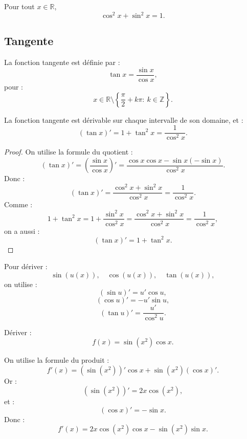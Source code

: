 \documentclass[11pt,a4paper]{article}
\newcommand{\Z}{\mathbb Z}
\newcommand{\R}{\mathbb R}
\begin{document}
\begin{theorembox}
Pour tout \(x\in\R\),
\[
\cos^2 x+\sin^2 x=1.
\]
\end{theorembox}

\subsection{Tangente}

\begin{definitionbox}[Tangente]
La fonction tangente est définie par :
\[
\tan x=\frac{\sin x}{\cos x},
\]
pour :
\[
x\in\R\setminus\left\{\frac{\pi}{2}+k\pi:\ k\in\Z\right\}.
\]
\end{definitionbox}

\begin{theorembox}
La fonction tangente est dérivable sur chaque intervalle de son domaine, et :
\[
(\tan x)'=1+\tan^2 x=\frac1{\cos^2 x}.
\]
\end{theorembox}

\begin{proof}
On utilise la formule du quotient :
\[
(\tan x)'=
\left(\frac{\sin x}{\cos x}\right)'
=
\frac{\cos x\cos x-\sin x(-\sin x)}{\cos^2 x}.
\]
Donc :
\[
(\tan x)'=\frac{\cos^2 x+\sin^2 x}{\cos^2 x}
=
\frac1{\cos^2 x}.
\]
Comme :
\[
1+\tan^2 x
=
1+\frac{\sin^2 x}{\cos^2 x}
=
\frac{\cos^2 x+\sin^2 x}{\cos^2 x}
=
\frac1{\cos^2 x},
\]
on a aussi :
\[
(\tan x)'=1+\tan^2 x.
\]
\end{proof}

\begin{methodbox}
Pour dériver :
\[
\sin(u(x)),\quad \cos(u(x)),\quad \tan(u(x)),
\]
on utilise :
\[
(\sin u)'=u'\cos u,
\]
\[
(\cos u)'=-u'\sin u,
\]
\[
(\tan u)'=\frac{u'}{\cos^2 u}.
\]
\end{methodbox}

\begin{exercicebox}[Trigonométrie]
Dériver :
\[
f(x)=\sin(x^2)\cos x.
\]
\end{exercicebox}

\begin{correctionbox}
On utilise la formule du produit :
\[
f'(x)=(\sin(x^2))'\cos x+\sin(x^2)(\cos x)'.
\]
Or :
\[
(\sin(x^2))'=2x\cos(x^2),
\]
et :
\[
(\cos x)'=-\sin x.
\]
Donc :
\[
f'(x)=2x\cos(x^2)\cos x-\sin(x^2)\sin x.
\]
\end{correctionbox}

\end{document}
